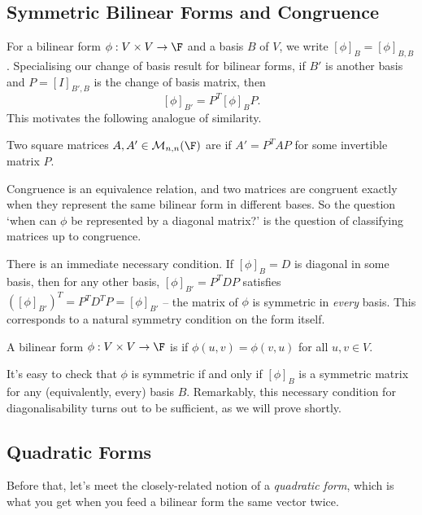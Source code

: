 \subsection{Symmetric Bilinear Forms and Congruence}

For a bilinear form $\phi: V \times V \rightarrow \F$ and a basis $B$ of $V$, we write $[\phi]_B = [\phi]_{B, B}$. Specialising our change of basis result for bilinear forms, if $B'$ is another basis and $P = [I]_{B', B}$ is the change of basis matrix, then
$$
[\phi]_{B'} = P^T [\phi]_B P.
$$
This motivates the following analogue of similarity.

\begin{definition}
    Two square matrices $A, A' \in \mathcal{M}_{n,n}(\F)$ are  if $A' = P^T A P$ for some invertible matrix $P$.
\end{definition}

Congruence is an equivalence relation, and two matrices are congruent exactly when they represent the same bilinear form in different bases. So the question `when can $\phi$ be represented by a diagonal matrix?' is the question of classifying matrices up to congruence.

There is an immediate necessary condition. If $[\phi]_B = D$ is diagonal in some basis, then for any other basis, $[\phi]_{B'} = P^TDP$ satisfies $([\phi]_{B'})^T = P^T D^T P = [\phi]_{B'}$ -- the matrix of $\phi$ is symmetric in \emph{every} basis. This corresponds to a natural symmetry condition on the form itself.

\begin{definition}
    A bilinear form $\phi: V \times V \rightarrow \F$ is  if $\phi(u, v) = \phi(v, u)$ for all $u, v \in V$.
\end{definition}

It's easy to check that $\phi$ is symmetric if and only if $[\phi]_B$ is a symmetric matrix for any (equivalently, every) basis $B$. Remarkably, this necessary condition for diagonalisability turns out to be sufficient, as we will prove shortly.

\subsection{Quadratic Forms}

Before that, let's meet the closely-related notion of a \emph{quadratic form}, which is what you get when you feed a bilinear form the same vector twice.

